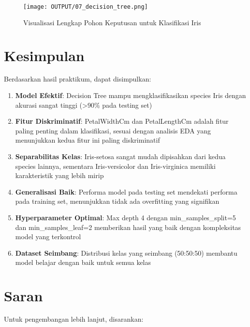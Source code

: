 \documentclass[11pt,a4paper]{article}
\begin{document}
\begin{figure}[h]
    \centering
    \texttt{[image: OUTPUT/07\_decision\_tree.png]}
    \caption{Visualisasi Lengkap Pohon Keputusan untuk Klasifikasi Iris}
    \label{fig:decision_tree}
\end{figure}

\clearpage

\section{Kesimpulan}

Berdasarkan hasil praktikum, dapat disimpulkan:

\begin{enumerate}
    \item \textbf{Model Efektif}: Decision Tree mampu mengklasifikasikan species Iris dengan akurasi sangat tinggi (>90\% pada testing set)

    \item \textbf{Fitur Diskriminatif}: PetalWidthCm dan PetalLengthCm adalah fitur paling penting dalam klasifikasi, sesuai dengan analisis EDA yang menunjukkan kedua fitur ini paling diskriminatif

    \item \textbf{Separabilitas Kelas}: Iris-setosa sangat mudah dipisahkan dari kedua species lainnya, sementara Iris-versicolor dan Iris-virginica memiliki karakteristik yang lebih mirip

    \item \textbf{Generalisasi Baik}: Performa model pada testing set mendekati performa pada training set, menunjukkan tidak ada overfitting yang signifikan

    \item \textbf{Hyperparameter Optimal}: Max depth 4 dengan min\_samples\_split=5 dan min\_samples\_leaf=2 memberikan hasil yang baik dengan kompleksitas model yang terkontrol

    \item \textbf{Dataset Seimbang}: Distribusi kelas yang seimbang (50:50:50) membantu model belajar dengan baik untuk semua kelas
\end{enumerate}

\section{Saran}

Untuk pengembangan lebih lanjut, disarankan:
\end{document}

